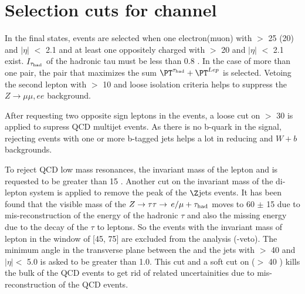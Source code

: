 \section{\texorpdfstring{Selection cuts for \leptonTau channel}{Selection cuts for lepton-tau channel}}
\label{sect:eleTauCuts}

In the \leptonTau final states, events are selected when one electron(muon) with \PT $>$ 25 (20) \GeV and $|\eta|$ $<$ 2.1 and at least 
one oppositely charged \Tau with \PT $>$ 20 \GeV and $|\eta|$ $<$ 2.1 exist. $I_{\tau_{\rm had}}$ of the hadronic tau must be less than 0.8 \GeV.
In the case of more than one pair, the pair that maximizes the sum $\PT^{\Tau} + \PT^{Lep}$ is selected.
Vetoing the second lepton with \PT $>$ 10 \GeV and loose isolation criteria helps to suppress the $Z\rightarrow \mu\mu, ee$ background.

After requesting two opposite sign leptons in the events, a loose cut on \MET $>$ 30 \GeV is applied to supress QCD multijet events. 
As there is no b-quark in the signal, rejecting events with one or more b-tagged jets helps a lot in reducing \ttbar and $W+b$ backgrounds.

To reject QCD low mass resonances, the invariant mass of the lepton and \Tau is requested to be greater than 15 \GeV. 
Another cut on the invariant mass of the di-lepton system is applied to remove the peak of the $\Z$jets events. 
It has been found that the visible mass of the $Z\to\tau\tau\to\,e/\mu +\tau_{\rm had}$ moves to 60 $\pm$ 15 \GeV due to 
mis-reconstruction of the energy of the hadronic $\tau$ and also the missing energy due to the decay of the $\tau$ to leptons. 
So the events with the invariant mass of lepton \Tau in the window of [45, 75] are excluded from the analysis (\Z-veto). 
The minimum angle in the transverse plane between the \MET and the jets with \PT $>$ 40 \GeV and $|\eta| <$ 5.0 
is asked to be greater than 1.0. This cut and a soft cut on \mttwo ($>$ 40 \GeV) kills the bulk of the QCD events 
to get rid of related uncertainities due to mis-reconstruction of the QCD events. 

